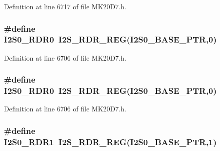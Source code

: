 Definition at line 6717 of file M\+K20\+D7.\+h.

\subsubsection[{\texorpdfstring{I2\+S0\+\_\+\+R\+D\+R0}{I2S0_RDR0}}]{\setlength{\rightskip}{0pt plus 5cm}\#define I2\+S0\+\_\+\+R\+D\+R0~{\bf I2\+S\+\_\+\+R\+D\+R\+\_\+\+R\+EG}({\bf I2\+S0\+\_\+\+B\+A\+S\+E\+\_\+\+P\+TR},0)}\hypertarget{group___i2_s___register___accessor___macros_gace57e1a687b83e5829e789216a0920f8}{}\label{group___i2_s___register___accessor___macros_gace57e1a687b83e5829e789216a0920f8}


Definition at line 6706 of file M\+K20\+D7.\+h.

\subsubsection[{\texorpdfstring{I2\+S0\+\_\+\+R\+D\+R0}{I2S0_RDR0}}]{\setlength{\rightskip}{0pt plus 5cm}\#define I2\+S0\+\_\+\+R\+D\+R0~{\bf I2\+S\+\_\+\+R\+D\+R\+\_\+\+R\+EG}({\bf I2\+S0\+\_\+\+B\+A\+S\+E\+\_\+\+P\+TR},0)}\hypertarget{group___i2_s___register___accessor___macros_gace57e1a687b83e5829e789216a0920f8}{}\label{group___i2_s___register___accessor___macros_gace57e1a687b83e5829e789216a0920f8}


Definition at line 6706 of file M\+K20\+D7.\+h.

\subsubsection[{\texorpdfstring{I2\+S0\+\_\+\+R\+D\+R1}{I2S0_RDR1}}]{\setlength{\rightskip}{0pt plus 5cm}\#define I2\+S0\+\_\+\+R\+D\+R1~{\bf I2\+S\+\_\+\+R\+D\+R\+\_\+\+R\+EG}({\bf I2\+S0\+\_\+\+B\+A\+S\+E\+\_\+\+P\+TR},1)}\hypertarget{group___i2_s___register___accessor___macros_gafd36ad48f3ce634252dadb1b3e867d21}{}\label{group___i2_s___register___accessor___macros_gafd36ad48f3ce634252dadb1b3e867d21}


